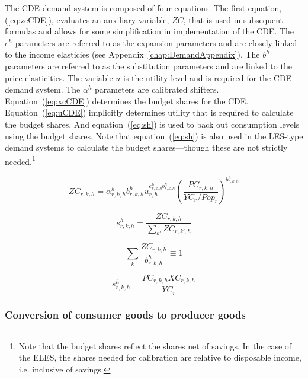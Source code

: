 \documentclass[11pt,letterpaper]{report}
\begin{document}
The CDE demand system is composed of four equations. The first equation,
(\ref{eq:zcCDE}), evaluates an auxiliary variable, $\mathit{ZC}$, that is used in
subsequent formulas and allows for some simplification in implementation of the
CDE. The $e^h$ parameters are referred to as the
expansion parameters and are closely linked to the income elasticies (see
Appendix~\ref{chap:DemandAppendix}). The $b^h$ parameters are referred to as the
substitution parameters and are linked to the price elasticities. The variable
$u$ is the utility level and is required for the CDE demand system. The
$\alpha^h$ parameters are calibrated shifters. Equation~(\ref{eq:xcCDE})
determines the budget shares for the CDE. Equation~(\ref{eq:uCDE}) implicitly
determines utility that is required to calculate the budget shares. And
equation~(\ref{eq:sh}) is used to back out consumption levels using the budget
shares. Note that equation~(\ref{eq:sh}) is also used in the LES-type demand
systems to calculate the budget shares---though these are not strictly
needed.\footnote{Note that the budget shares reflect the shares net of savings.
In the case of the ELES, the shares needed for calibration are relative to
disposable income, i.e. inclusive of savings.}

\begin{equation}
\label{eq:zcCDE}
\mathit{ZC}_{r,k,h} =
   \alpha^h_{r,k,h} b^h_{r,k,h} u_{r,h}^{e^h_{r,k,h} b^h_{r,k,h}}
   {\left(
      \frac{\mathit{PC}_{r,k,h}} {\mathit{YC}_{r}/\mathit{Pop}_r}
    \right)}^{b^h_{r,k,h}
   }
\end{equation}

\begin{equation}
\label{eq:xcCDE}
s^h_{r,k,h} =
   \frac{\mathit{ZC}_{r,k,h}} {\displaystyle \sum_{k'}{\mathit{ZC}_{r,k',h}}}
\end{equation}

\begin{equation}
\label{eq:uCDE}
\sum_{k} {\frac {\mathit{ZC}_{r,k,h}}{b^h_{r,k,h}}} \equiv 1
\end{equation}

\begin{equation}
\label{eq:sh}
s^h_{r,k,h} =
   \frac{\mathit{PC}_{r,k,h} \mathit{XC}_{r,k,h}} {\mathit{YC_{r}}}
\end{equation}

\subsubsection{Conversion of consumer goods to producer goods}
\end{document}
